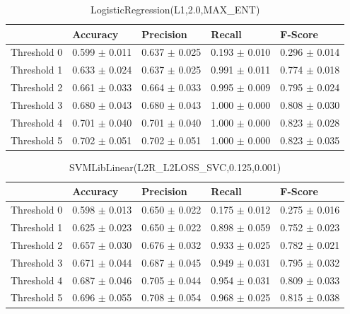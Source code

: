 \begin{table}[h]
	\centering
	\begin{tabular}{|l|l|l|l|l|} %
	\hline
	& Accuracy & Precision & Recall & F-Score \\ \hline
	Threshold 0 & 0.599	\( \pm \) 0.011	& 0.637	\( \pm \) 0.025	& 0.193	\( \pm \) 0.010	& 0.296	\( \pm \) 0.014	\\ \hline
	Threshold 1 & 0.633	\( \pm \) 0.024	& 0.637	\( \pm \) 0.025	& 0.991	\( \pm \) 0.011	& 0.774	\( \pm \) 0.018	\\ \hline
	Threshold 2 & 0.661	\( \pm \) 0.033	& 0.664	\( \pm \) 0.033	& 0.995	\( \pm \) 0.009	& 0.795	\( \pm \) 0.024	\\ \hline
	Threshold 3 & 0.680	\( \pm \) 0.043	& 0.680	\( \pm \) 0.043	& 1.000	\( \pm \) 0.000	& 0.808	\( \pm \) 0.030	\\ \hline
	Threshold 4 & 0.701	\( \pm \) 0.040	& 0.701	\( \pm \) 0.040	& 1.000	\( \pm \) 0.000	& 0.823	\( \pm \) 0.028	\\ \hline
	Threshold 5 & 0.702	\( \pm \) 0.051	& 0.702	\( \pm \) 0.051	& 1.000	\( \pm \) 0.000	& 0.823	\( \pm \) 0.035	\\ \hline
	\end{tabular}
	\caption{LogisticRegression(L1,2.0,MAX\_ENT)}
	\label{tab:revpol}
\end{table}
\begin{table}[h]
	\centering
	\begin{tabular}{|l|l|l|l|l|} %
	\hline
	& Accuracy & Precision & Recall & F-Score \\ \hline
	Threshold 0 & 0.598	\( \pm \) 0.013	& 0.650	\( \pm \) 0.022	& 0.175	\( \pm \) 0.012	& 0.275	\( \pm \) 0.016	\\ \hline
	Threshold 1 & 0.625	\( \pm \) 0.023	& 0.650	\( \pm \) 0.022	& 0.898	\( \pm \) 0.059	& 0.752	\( \pm \) 0.023	\\ \hline
	Threshold 2 & 0.657	\( \pm \) 0.030	& 0.676	\( \pm \) 0.032	& 0.933	\( \pm \) 0.025	& 0.782	\( \pm \) 0.021	\\ \hline
	Threshold 3 & 0.671	\( \pm \) 0.044	& 0.687	\( \pm \) 0.045	& 0.949	\( \pm \) 0.031	& 0.795	\( \pm \) 0.032	\\ \hline
	Threshold 4 & 0.687	\( \pm \) 0.046	& 0.705	\( \pm \) 0.044	& 0.954	\( \pm \) 0.031	& 0.809	\( \pm \) 0.033	\\ \hline
	Threshold 5 & 0.696	\( \pm \) 0.055	& 0.708	\( \pm \) 0.054	& 0.968	\( \pm \) 0.025	& 0.815	\( \pm \) 0.038	\\ \hline
	\end{tabular}
	\caption{SVMLibLinear(L2R\_L2LOSS\_SVC,0.125,0.001)}
	\label{tab:revpol}
\end{table}
